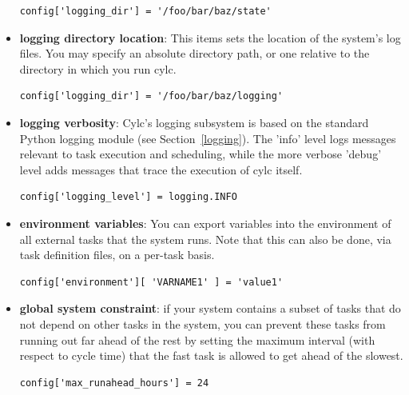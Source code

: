 \documentclass[11pt,a4paper]{article}
\begin{document}
\begin{itemize}
        \begin{lstlisting}
config['logging_dir'] = '/foo/bar/baz/state'
        \end{lstlisting}


    \item {\bf logging directory location}: 
        This items sets the location of the system's log files. You may
        specify an absolute directory path, or one relative to the
        directory in which you run cylc.

        \begin{lstlisting}
config['logging_dir'] = '/foo/bar/baz/logging'
        \end{lstlisting}

    \item {\bf logging verbosity}: Cylc's logging subsystem is based on
        the standard Python logging module (see
        Section~\ref{logging}). The 'info' level logs messages
        relevant to task execution and scheduling, while the more
        verbose 'debug' level adds messages that trace the execution of
        cylc itself.

        \begin{lstlisting}
config['logging_level'] = logging.INFO
        \end{lstlisting}

    \item {\bf environment variables}: You can export variables into the 
        environment of all external tasks that the system runs. Note that
        this can also be done, via task definition files, on a per-task
        basis.

        \begin{lstlisting}
config['environment'][ 'VARNAME1' ] = 'value1'
        \end{lstlisting}

    \item {\bf global system constraint}: if your system contains a
        subset of tasks that do not depend on other tasks in the system, 
        you can prevent these tasks from running out far ahead of the 
        rest by setting the maximum interval (with respect to cycle
        time) that the fast task is allowed to get ahead of the slowest.
        
        \begin{lstlisting}
config['max_runahead_hours'] = 24
        \end{lstlisting}

\end{itemize}
\end{document}
